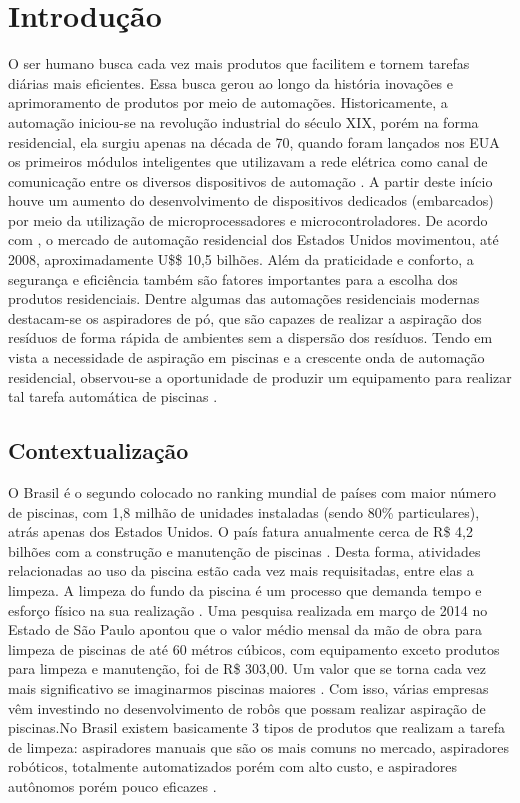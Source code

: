\chapter{Introdução}
O ser humano busca cada vez mais produtos que facilitem e tornem tarefas 
diárias mais eficientes. Essa busca gerou ao longo da história inovações e 
aprimoramento de produtos por meio de automações. Historicamente, a automação 
iniciou-se na revolução industrial do século XIX, porém na forma residencial, 
ela surgiu apenas na década de 70, quando foram lançados nos EUA os primeiros 
módulos inteligentes que utilizavam a rede elétrica como canal de comunicação 
entre os diversos dispositivos de automação \cite{bortoluzzi2013}. A partir deste início 
houve um aumento do desenvolvimento de dispositivos dedicados (embarcados) por 
meio da utilização de microprocessadores e microcontroladores. De acordo com 
, o mercado de automação residencial dos Estados Unidos 
movimentou, até 2008, aproximadamente U\$\$ 10,5 bilhões. Além da praticidade 
e conforto, a segurança e eficiência também são fatores importantes para a 
escolha dos produtos residenciais. Dentre algumas das automações residenciais 
modernas destacam-se os aspiradores de pó, que são capazes de realizar a 
aspiração dos resíduos de forma rápida de ambientes sem a dispersão dos 
resíduos. Tendo em vista a necessidade de aspiração em piscinas e a crescente 
onda de automação residencial, observou-se a oportunidade de produzir um 
equipamento para realizar tal tarefa automática de piscinas \cite{kanno2014}.

\section{Contextualização}
O Brasil é o segundo colocado no ranking mundial de países com maior número de 
piscinas, com 1,8 milhão de unidades instaladas (sendo 80\% particulares), 
atrás apenas dos Estados Unidos. O país fatura anualmente cerca de R\$ 4,2 
bilhões com a construção e manutenção de piscinas \cite{portalfatorbrasil2013}. Desta 
forma, atividades relacionadas ao uso da piscina estão cada vez mais 
requisitadas, entre elas a limpeza. A limpeza do fundo da piscina é um processo
que demanda tempo e esforço físico na sua realização . Uma pesquisa realizada 
em  março de 2014 no Estado de São Paulo apontou que o valor médio mensal da 
mão de obra para limpeza de piscinas de até 60 métros cúbicos, com equipamento exceto 
produtos para limpeza e manutenção,  foi de R\$ 303,00. Um valor que se torna 
cada vez mais significativo se imaginarmos piscinas maiores \cite{datafolha2014}. 
Com isso, várias empresas vêm investindo no desenvolvimento de robôs que possam
realizar aspiração de piscinas.No Brasil existem basicamente 3 tipos de 
produtos que realizam a tarefa de limpeza: aspiradores manuais que são os mais 
comuns no mercado, aspiradores robóticos, totalmente automatizados porém com 
alto custo, e aspiradores autônomos porém pouco eficazes \cite{miura2006}.

